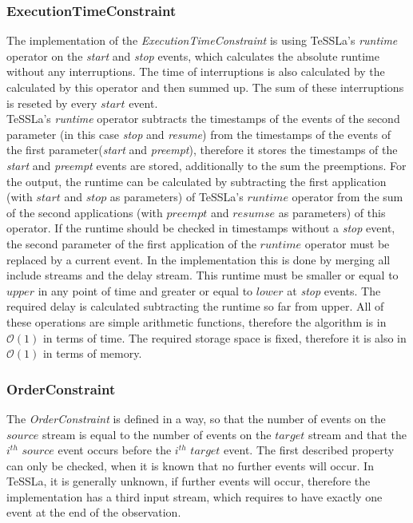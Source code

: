 \subsubsection{ExecutionTimeConstraint}
	The implementation of the \emph{ExecutionTimeConstraint} is using TeSSLa's \emph{runtime} operator on the \emph{start} and \emph{stop} events, which calculates the absolute runtime without any interruptions. The time of interruptions is also calculated by the calculated by this operator and then summed up. The sum of these interruptions is reseted by every $start$ event.\\
	TeSSLa's \emph{runtime} operator subtracts the timestamps of the events of the second parameter (in this case \emph{stop} and \emph{resume}) from the timestamps of the events of the first parameter(\emph{start} and \emph{preempt}), therefore it stores the timestamps of the \emph{start} and \emph{preempt} events are stored, additionally to the sum the preemptions.
	For the output, the runtime can be calculated by subtracting the first application (with $start$ and $stop$ as parameters) of TeSSLa's $runtime$ operator from the sum of the second applications (with $preempt$ and $resumse$ as parameters) of this operator. If the runtime should be checked in timestamps without a \emph{stop} event, the second parameter of the first application of the $runtime$ operator must be replaced by a current event. In the implementation this is done by merging all include streams and the delay stream. This runtime must be smaller or equal to $upper$ in any point of time and greater or equal to $lower$ at \emph{stop} events. The required delay is calculated subtracting the runtime so far from upper. All of these operations are simple arithmetic functions, therefore the algorithm is in $\mathcal{O}(1)$ in terms of time. The required storage space is fixed, therefore it is also in $\mathcal{O}(1)$ in terms of memory.

\subsubsection{OrderConstraint}
	The \emph{OrderConstraint} is defined in a way, so that the number of events on the $source$ stream is equal to the number of events on the $target$ stream and that the $i^{th}$ $source$ event occurs before the  $i^{th}$ $target$ event. The first described property can only be checked, when it is known that no further events will occur. In TeSSLa, it is generally unknown, if further events will occur, therefore the implementation has a third input stream, which requires to have exactly one event at the end of the observation.
	
